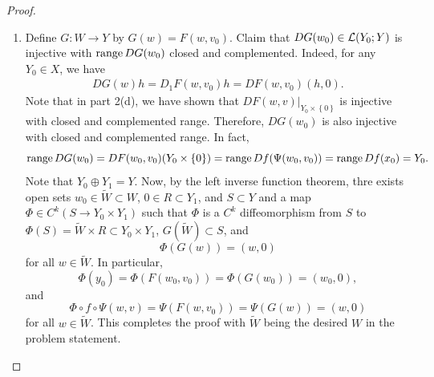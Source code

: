 \documentclass[a4paper]{article}
\begin{document}
\begin{proof}
{\begin{enumerate}
Next we show $D_2 \eta (w, v) = 0$. Let $h \in X_0$ be 
arbitrary. By the definition of $\eta$, we have 
\[
\begin{aligned}
D_2 \eta (h) 
&= \pyy \circ Df(\Psi(w, v)) D_2 \Psi(w, v) h \\
&= \pyy \circ Df(\Psi(w, v)) D\Psi(0, h) \\
&= \pyy \circ DF(w, v) (0, h).
\end{aligned}
\]
Now, using the fact that $DF(w, v) \circ T = I$, we have 
\[
\begin{aligned}
DF(w, v) (0, h) 
&= DF(w, v) \circ T \circ DF(w, v) (0, h) \\ 
&= DF(w, v) (\py \circ DF(w, v)(0, h), 0).
\end{aligned}
\]
Claim that $\py \circ DF(w, v) (0, h) = 0$. Indeed, 
let $D\Psi(w, v) (0, h)  = u$. Note that $D\Psi(w, v) 
= [Dg(\Psi(w, v))]^{-1}$ and $Dg(x) k = (\py \circ Df(x) k, 
\px k)$ for all $x \in U$ and $k \in X$. 
It follows that $\py \circ Df(\Psi(w, v)) u = 0$.
Therefore, 
\[
\py \circ DF(w, v) (0, h) = \py \circ Df(\Psi(w, v)) 
D\Psi(w, v) (0, h) = \py \circ Df(\Psi(w, v)) u = 0.
\]
Hence, 
\[
D_2 \eta (h) = \pyy \circ DF(w, v) (0, h) 
= \pyy \circ DF(w, v)(0, 0) 
= 0.
\]
This implies that $D_2 \eta(w, v) = 0$, as desired.

Now, by the equality in part 2(a), we have 
\[
D_2 F(w, v) = D_2 \eta(w, v) = 0.
\]
for all $(w, v) \in W \times V$.
Now by the mean value theorem,
\[
\begin{aligned}
\norm{F(w, v) - F(w, v_0)} 
\leq \norm{v - v_0} \sup_{h \in V} \norm{D_2 F(w, h)} 
= 0.
\end{aligned}
\]
Therefore, $F(w, v) = F(w, v_0)$ for all $(w, v) 
\in W \times V$.

\item Define $G : W \to Y$ by $G(w) = F(w, v_0)$. Claim 
that $DG(w_0) \in \mathcal{L}(Y_0; Y)$ is injective with 
$\operatorname{range} DG(w_0)$ closed and complemented. Indeed, 
for any $Y_0 \in X$, we have 
\[
\begin{aligned}
DG(w)h = D_1 F(w, v_0)h = DF(w, v_0)(h, 0).
\end{aligned}
\]
Note that in part 2(d), we have shown that 
$DF(w, v) \vert_{Y_0 \times \left\{ 0 \right\}}$
is injective with closed and complemented range. 
Therefore, $DG(w_0)$ is also injective with 
closed and complemented range. In fact,
\[
\operatorname{range} DG(w_0) = DF(w_0, v_0) (Y_0 \times \left\{ 0 \right\})
= \operatorname{range} Df(\Psi(w_0, v_0)) = \operatorname{range} Df(x_0) = Y_0.
\]
Note that $Y_0 \oplus Y_1 = Y$.
Now, by the left inverse function theorem, thre exists 
open sets $w_0 \in \tilde{W} \subset W$, 
$0 \in R \subset Y_1$, and 
$S \subset Y$ and a map $\Phi \in C^k(S \to Y_0 \times Y_1)$
such that $\Phi$ is a $C^k$ diffeomorphism from $S$
to $\Phi(S) = \tilde{W} \times R \subset Y_0 \times Y_1$,
$G(\tilde{W}) \subset S$, and 
\[
\Phi(G(w)) = (w, 0) 
\]
for all $w \in \tilde{W}$. In particular,
\[
\Phi(y_0) = \Phi(F(w_0, v_0)) = \Phi(G(w_0)) = (w_0, 0),
\]
and 
\[
\Phi \circ f \circ \Psi(w, v) = \Psi(F(w, v_0)) = 
\Psi(G(w)) = (w, 0)
\]
for all $w \in \tilde{W}$. This completes the proof with 
$\tilde{W}$ being the desired $W$ in the problem statement.
\end{enumerate}  

}
\end{proof}
\end{document}
